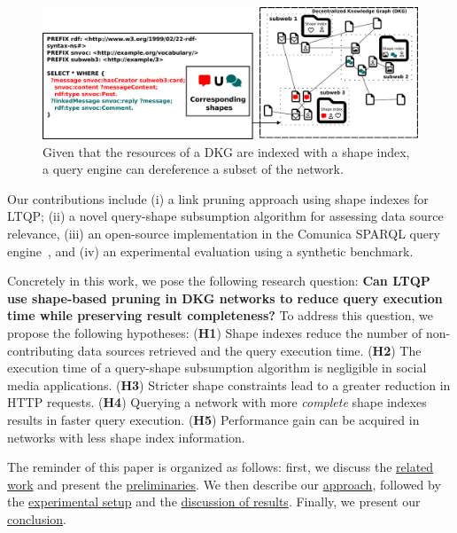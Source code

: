 \begin{figure}
   \centering
   \includegraphics[width=1\textwidth]{figure/dkg.pdf}
   \caption{
      Given that the resources of a DKG are indexed with a shape index, a query engine can dereference a subset of the network.
    }
    \label{fig:dkg}
\end{figure}

Our contributions include (i) a link pruning approach using shape indexes for LTQP; (ii) a novel query-shape subsumption algorithm for assessing data source relevance, (iii) an open-source implementation in the 
Comunica SPARQL query engine~\cite{taelman_iswc_resources_comunica_2018}, and (iv) an experimental evaluation using a synthetic benchmark.

Concretely in this work, we pose the following research question: 
\textbf{Can LTQP use shape-based pruning in DKG networks to reduce query execution time while preserving result completeness?}
To address this question, we propose the following hypotheses:  
(\textbf{H1}) Shape indexes reduce the number of non-contributing data sources retrieved and the query execution time.  
(\textbf{H2}) The execution time of a query-shape subsumption algorithm is negligible in social media applications.  
(\textbf{H3}) Stricter shape constraints lead to a greater reduction in HTTP requests.  
(\textbf{H4}) Querying a network with more \emph{complete} shape indexes results in faster query execution.  
(\textbf{H5}) Performance gain can be acquired in networks with less shape index information.

The reminder of this paper is organized as follows: first, we discuss the \hyperref[sec:related_work]{related work} and present the \hyperref[sec:preliminaries]{preliminaries}.
We then describe our \hyperref[sec:approach]{approach}, followed by the \hyperref[sec:experiment]{experimental setup} and the \hyperref[sec:result]{discussion of results}.
Finally, we present our \hyperref[sec:conclusion]{conclusion}.
